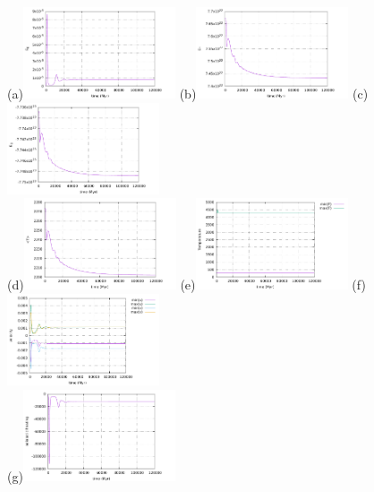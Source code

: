 \begin{center}
(a)\includegraphics[width=4.5cm]{python_codes/fieldstone_24/EBA_105/EK}
(b)\includegraphics[width=4.5cm]{python_codes/fieldstone_24/EBA_105/ET}
(c)\includegraphics[width=4.5cm]{python_codes/fieldstone_24/EBA_105/EG}\\
(d)\includegraphics[width=4.5cm]{python_codes/fieldstone_24/EBA_105/Tavrg}
(e)\includegraphics[width=4.5cm]{python_codes/fieldstone_24/EBA_105/T_stats}
(f)\includegraphics[width=4.5cm]{python_codes/fieldstone_24/EBA_105/vel_stats}\\
(g)\includegraphics[width=4.5cm]{python_codes/fieldstone_24/EBA_105/adiabatic_heating}

\end{center}
